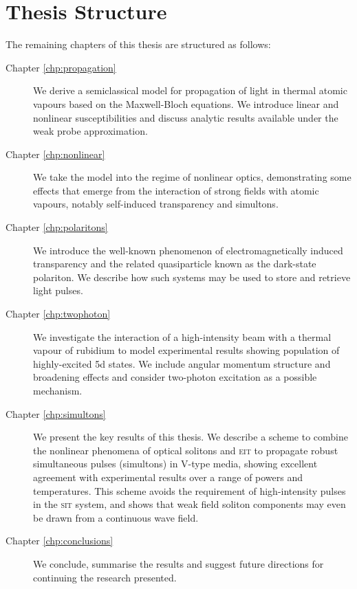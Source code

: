\section{Thesis Structure}
  \label{sec:intro_structure}

  The remaining chapters of this thesis are structured as follows:

  \begin{description}
  \item[Chapter \ref{chp:propagation}]

    We derive a semiclassical model for propagation of light in thermal atomic
    vapours based on the Maxwell-Bloch equations. We introduce linear and
    nonlinear susceptibilities and discuss analytic results available under the
    weak probe approximation.

  \item[Chapter \ref{chp:nonlinear}]

    We take the model into the regime of nonlinear optics, demonstrating some
    effects that emerge from the interaction of strong fields with atomic
    vapours, notably self-induced transparency and simultons.

  \item[Chapter \ref{chp:polaritons}]

    We introduce the well-known phenomenon of electromagnetically induced
    transparency and the related quasiparticle known as the dark-state
    polariton. We describe how such systems may be used to store and retrieve
    light pulses.

  \item[Chapter \ref{chp:twophoton}]

    We investigate the interaction of a high-intensity beam with a thermal
    vapour of rubidium to model experimental results showing population of
    highly-excited 5d states. We include angular momentum structure and
    broadening effects and consider two-photon excitation as a possible
    mechanism.

  \item[Chapter \ref{chp:simultons}]

    We present the key results of this thesis. We describe a scheme to combine
    the nonlinear phenomena of optical solitons and \textsc{eit} to propagate
    robust simultaneous pulses (simultons) in V-type media, showing excellent
    agreement with experimental results over a range of powers and temperatures.
    This scheme avoids the requirement of high-intensity pulses in the
    \textsc{sit} system, and shows that weak field soliton components may even
    be drawn from a continuous wave field.

  \item[Chapter \ref{chp:conclusions}]

    We conclude, summarise the results and suggest future directions for
    continuing the research presented.

\end{description}